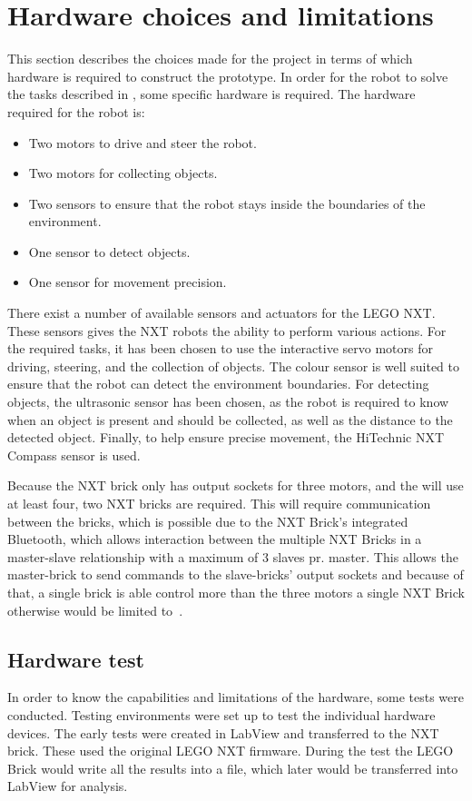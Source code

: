 \section{Hardware choices and limitations}\label{sec:hardware}

This section describes the choices made for the project in terms of which hardware is required to construct the \projname{} prototype. In order for the robot to solve the tasks described in , some specific hardware is required. The hardware required for the robot is:

\begin{itemize}
\item Two motors to drive and steer the robot.
\item Two motors for collecting objects.
\item Two sensors to ensure that the robot stays inside the boundaries of the environment.
\item One sensor to detect objects.
\item One sensor for movement precision.
\end{itemize}

There exist a number of available sensors and actuators for the LEGO NXT. These sensors gives the NXT robots the ability to perform various actions. For the required tasks, it has been chosen to use the interactive servo motors for driving, steering, and the collection of objects. The colour sensor is well suited to ensure that the robot can detect the environment boundaries. For detecting objects, the ultrasonic sensor has been chosen, as the robot is required to know when an object is present and should be collected, as well as the distance to the detected object. Finally, to help ensure precise movement, the HiTechnic NXT Compass sensor is used.

Because the NXT brick only has output sockets for three motors, and the \projname{} will use at least four, two NXT bricks are required. This will require communication between the bricks, which is possible due to the NXT Brick's integrated Bluetooth, which allows interaction between the multiple NXT Bricks in a master-slave relationship with a maximum of 3 slaves pr. master. This allows the master-brick to send commands to the slave-bricks' output sockets and because of that, a single brick is able control more than the three motors a single NXT Brick otherwise would be limited to~\citep{lego_edu_guide}.

\subsection{Hardware test} \label{sec:hardware_test}
In order to know the capabilities and limitations of the hardware, some tests were conducted. Testing environments were set up to test the individual hardware devices. The early tests were created in LabView and transferred to the NXT brick. These used the original LEGO NXT firmware. During the test the LEGO Brick would write all the results into a file, which later would be transferred into LabView for analysis. 


